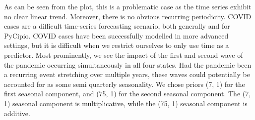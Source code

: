 \documentclass{article}
\begin{document}
As can be seen from the plot, this is a problematic case as the time series exhibit no clear linear trend. Moreover, there is no obvious recurring periodicity. COVID cases are a difficult time-series forecasting scenario, both generally and for PyCipio. COVID cases have been successfully modelled in more advanced settings, but it is difficult when we restrict ourselves to only use time as a predictor. Most prominently, we see the impact of the first and second wave of the pandemic occurring simultaneously in all four states. Had the pandemic been a recurring event stretching over multiple years, these waves could potentially be accounted for as some semi quarterly seasonality. We chose priors (7, 1) for the first seasonal component, and (75, 1) for the second seasonal component. The (7, 1) seasonal component is multiplicative, while the (75, 1) seasonal component is additive. 
\end{document}
